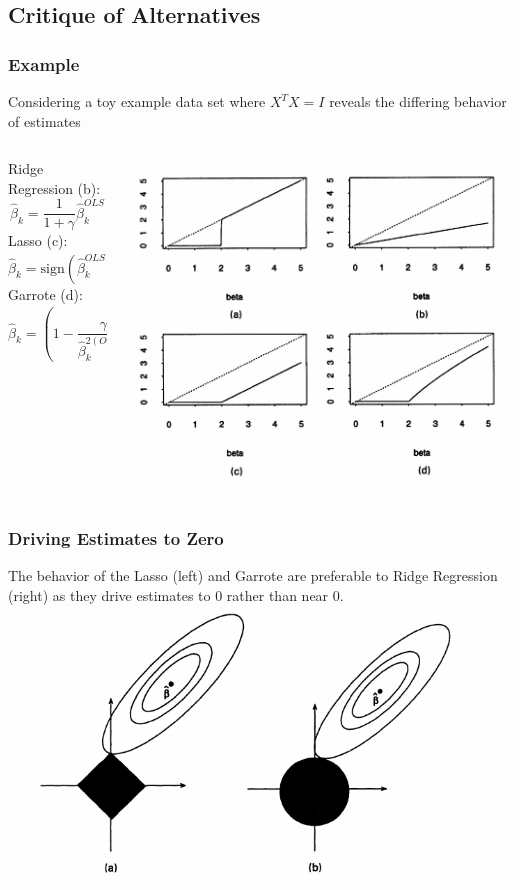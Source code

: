 \documentclass{beamer} %
\theoremstyle{definition}
\begin{document}
\subsection{Critique of Alternatives}
\begin{frame}
\frametitle{Example}
Considering a toy example data set where $X^TX=I$ reveals the differing behavior of estimates

\small{\begin{columns}
\begin{column}{.4\textwidth}
Ridge Regression (b): \[ \hat\beta_k=\frac{1}{1+\gamma}\hat\beta^{OLS}_k \]
Lasso (c): \[ \hat\beta_k=\text{sign}(\hat\beta^{OLS}_k)(|\hat\beta^{OLS}_k|-\gamma)^+ \]
Garrote (d): \[ \hat\beta_k = \left(1-\frac{\gamma}{\hat\beta^{2(OLS)}_k}\right)^+\hat\beta^{OLS}_k \]
\end{column}
\begin{column}{.6\textwidth}
\includegraphics[width=\textwidth]{betas.png}
\end{column}
\end{columns}}
\end{frame}

\begin{frame}
\frametitle{Driving Estimates to Zero}
The behavior of the Lasso (left) and Garrote are preferable to Ridge Regression (right) as they drive estimates to 0 rather than near 0.
\includegraphics[width=\textwidth]{solutions.png}
\end{frame}
\end{document}

